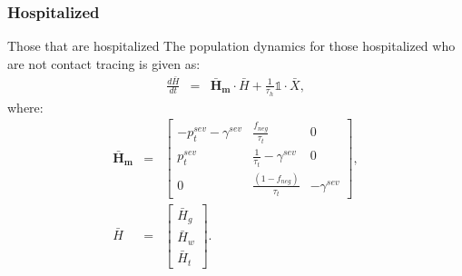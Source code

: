 \documentclass[notitlepage, superscriptaddress]{revtex4-2}
\begin{document}
\subsubsection{Hospitalized}
Those that are hospitalized 
The population dynamics for those hospitalized who are not contact tracing is given as:
\begin{eqnarray}
\frac{d\bar{H}}{dt} &=& \boldsymbol{\bar{H}_{m}} \cdot  \bar{H} + \frac{1}{\tau_{h}} \mathbb{1} \cdot  \bar{X}, 
\end{eqnarray}
%
where:
\begin{eqnarray}
\boldsymbol{\bar{H}_{m}} &=&
\begin{bmatrix}
- p^{sev}_{t} - \gamma^{sev}  &  \frac{f_{neg}}{\tau_{t}}            & 0 \\ 
 p^{sev}_{t}              & \frac{1}{\tau_{t}} - \gamma^{sev}       & 0  \\ 
 0                  & \frac{(1- f_{neg})}{\tau_{t}}                        & -\gamma^{sev}
\end{bmatrix}, \\ 
%
\bar{H} &=& 
\begin{bmatrix}
\bar{H}_{g} \\ \bar{H}_{w}\\ \bar{H}_{t}
\end{bmatrix}. \\ 
%
\end{eqnarray}
\end{document}
